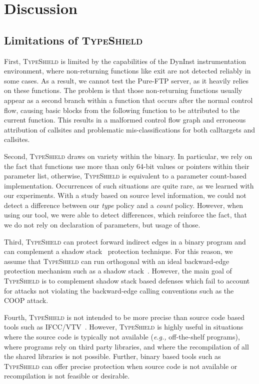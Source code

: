 \section{Discussion}
\label{chapter:Discussion}

\subsection{Limitations of \textsc{TypeShield}}
\label{section:limit}
First, \textsc{TypeShield} is limited by the capabilities of the DynInst instrumentation environment, where non-returning functions like exit are 
not detected reliably in some cases. As a result, we cannot test the Pure-FTP server, as it heavily relies on these functions. 
The problem is that those non-returning functions usually appear as a second branch within a function that occurs after the normal 
control flow, causing basic blocks from the following function to be attributed to the current function. This results in a malformed 
control flow graph and erroneous attribution of callsites and problematic mis-classifications for both calltargets and callsites.

Second, \textsc{TypeShield} draws on variety within the binary. In particular, we rely on the fact that functions use more than only 
64-bit values or pointers within their parameter list, otherwise, \textsc{TypeShield} is equivalent to a parameter count-based implementation. 
Occurrences of such situations are quite rare, as we learned with our experiments. With a study based on source level information, we could not 
detect a difference between our \textit{type} policy and a \textit{count} policy. However, when using our tool, we were able to detect differences,
which reinforce the fact, that we do not rely on declaration of parameters, but usage of those.

Third, \textsc{TypeShield} can protect forward indirect edges 
in a binary program and can complement a shadow stack~\cite{dang:asiaccs} protection technique. For this reason, we assume that \textsc{TypeShield} can run orthogonal with an 
ideal backward-edge protection mechanism such as a shadow stack~\cite{conti:ccs}. However, the main goal of \textsc{TypeShield} is to complement 
shadow stack based defenses which fail to account for attacks not violating the backward-edge calling conventions such as the COOP attack.

Fourth, \textsc{TypeShield} is not intended to be more precise than source code based tools such as IFCC/VTV~\cite{vtv:tice}. However, 
\textsc{TypeShield} is highly useful in situations where the source code is typically not available (\textit{e.g.,} off-the-shelf programs), 
where programs rely on third party libraries, and where the recompilation of all the shared libraries is not possible. 
Further, binary based tools such as \textsc{TypeShield} can offer precise protection when source code is not available or 
recompilation is not feasible or desirable.

